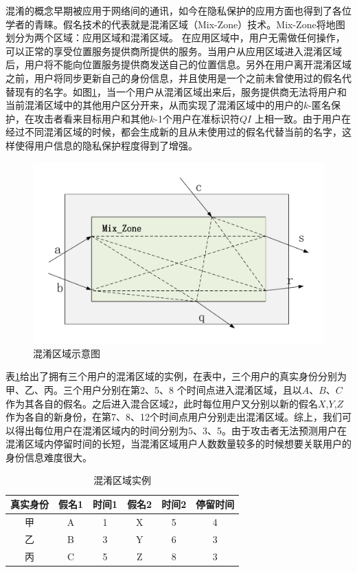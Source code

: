 混淆的概念早期被应用于网络间的通讯，如今在隐私保护的应用方面也得到了各位学者的青睐。假名技术的代表就是混淆区域（Mix-Zone）技术。Mix-Zone将地图划分为两个区域：应用区域和混淆区域\cite{Mix}。 在应用区域中，用户无需做任何操作，可以正常的享受位置服务提供商所提供的服务。当用户从应用区域进入混淆区域后，用户将不能向位置服务提供商发送自己的位置信息。另外在用户离开混淆区域之前，用户将同步更新自己的身份信息，并且使用是一个之前未曾使用过的假名代替现有的名字。如图\ref{fig:mix_zone_pdf}，当一个用户从混淆区域出来后，服务提供商无法将用户和当前混淆区域中的其他用户区分开来，从而实现了混淆区域中的用户的$k$-匿名保护，在攻击者看来目标用户和其他$k$-1个用户在准标识符$QI$ 上相一致。由于用户在经过不同混淆区域的时候，都会生成新的且从未使用过的假名代替当前的名字，这样使得用户信息的隐私保护程度得到了增强。
\begin{figure}[H]
\centering
\includegraphics[width=12cm]{fig/mix_zone.pdf}
\caption{混淆区域示意图} %
\label{fig:mix_zone_pdf}
\end{figure}
表\ref{mix}给出了拥有三个用户的混淆区域的实例，在表中，三个用户的真实身份分别为甲、乙、丙。三个用户分别在第2、5、8 个时间点进入混淆区域，且以$A$、$B$、$C$ 作为其各自的假名。之后进入混合区域2，此时每位用户又分别以新的假名$X$,$Y$,$Z$作为各自的新身份，在第7、8、12个时间点用户分别走出混淆区域。综上，我们可以得出每位用户在混淆区域内的时间分别为5、3、5。由于攻击者无法预测用户在混淆区域内停留时间的长短，当混淆区域用户人数数量较多的时候想要关联用户的身份信息难度很大。
\begin{table}[H]
\centering  %
\begin{tabular}{cccccc}  %
\hline
真实身份 &假名1&时间1 &假名2&时间2&停留时间\\ \hline  %
甲 &A &1 &X &5 &4\\         %
乙 &B &3 &Y &6 &3\\        %
丙 &C &5 &Z &8 &3\\ \hline
\end{tabular}
\caption{混淆区域实例}\label{mix}
\end{table}

